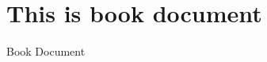 \documentclass[a4papper, 12pt]{book}
\begin{document}
\chapter{This is book document}
Book Document
\end{document}
